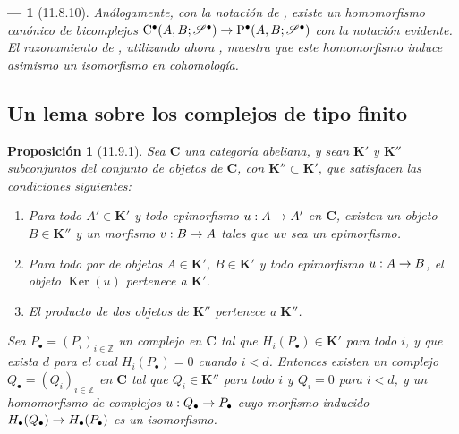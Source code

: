 \documentclass[10pt,oneside,openany]{book}
\theoremstyle{egaenv}\newtheorem*{env}{---}
\theoremstyle{egastatement}
\newtheorem*{proposition}{Proposición}
\theoremstyle{egadescription}
\renewcommand{\to}{\mathchoice{\longrightarrow}{\rightarrow}{\rightarrow}{\rightarrow}}
\begin{document}
\begin{env}[11.8.10]
\label{0.11.8.10}
\label{0.11.8.10-fr}
Análogamente, con la notación de , existe un
homomorfismo canónico de bicomplejos
$\mathrm C^\bullet(A,B;\mathscr S^\bullet)\to
\mathrm P^\bullet(A,B;\mathscr S^\bullet)$
con la notación evidente.
El razonamiento de , utilizando ahora , muestra que
este homomorfismo induce asimismo un \emph{isomorfismo} en cohomología.
\end{env}

\subsection{Un lema sobre los complejos de tipo finito}
\label{subsection:0.11.9}
\label{subsection:0.11.9-fr}

\begin{proposition}[11.9.1]
\label{0.11.9.1}
\label{0.11.9.1-fr}
Sea $\boldsymbol{C}$ una categoría abeliana, y sean $\boldsymbol{K}'$ y $\boldsymbol{K}''$ subconjuntos
del conjunto de objetos de $\boldsymbol{C}$, con $\boldsymbol{K}''\subset\boldsymbol{K}'$, que satisfacen las
condiciones siguientes:
\begin{enumerate}
  \item[{\rm(i)}]
  Para todo $A'\in\boldsymbol{K}'$ y todo epimorfismo $u:A\to A'$ en
  $\boldsymbol{C}$, existen un objeto $B\in\boldsymbol{K}''$ y un morfismo $v:B\to A$ tales que $uv$ sea un epimorfismo.
\item[{\rm(ii)}] Para todo par de objetos $A\in\boldsymbol{K}'$, $B\in\boldsymbol{K}'$ y todo epimorfismo $u:A\to B$,
  el objeto $\operatorname{Ker}(u)$ pertenece a $\boldsymbol{K}'$.

  \item[{\rm(iii)}]
  El producto de dos objetos de $\boldsymbol{K}''$ pertenece a $\boldsymbol{K}''$.
\end{enumerate}

Sea $P_\bullet=(P_i)_{i\in\mathbb Z}$ un complejo en $\boldsymbol{C}$ tal
que $H_i(P_\bullet)\in\boldsymbol{K}'$ para todo $i$, y que exista $d$ para el cual $H_i(P_\bullet)=0$ cuando $i<d$.
Entonces existen un complejo $Q_\bullet=(Q_i)_{i\in\mathbb Z}$ en $\boldsymbol{C}$
tal que $Q_i\in\boldsymbol{K}''$ para todo $i$ y $Q_i=0$ para $i<d$, y un
homomorfismo de complejos
$u:Q_\bullet\to P_\bullet$
cuyo morfismo inducido
$H_\bullet(Q_\bullet)\to H_\bullet(P_\bullet)$
es un isomorfismo.
\end{proposition}
\end{document}
